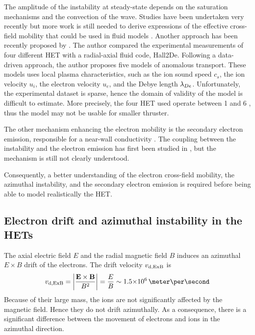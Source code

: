   The amplitude of the instability at steady-state depends on the saturation mechanisms and the convection of the wave.
  Studies have been  undertaken very recently but more work is still needed to derive expressions of the effective cross-field mobility that could be used in fluid models \citep{boeuf2017}.
  Another approach has been recently proposed by \citet{jorns2018}.
  The author compared the experimental measurements of four different \ac{HET} with a radial-axial fluid code, Hall2De.
  Following a data-driven approach, the author proposes five models of anomalous transport.
  These models uses local plasma characteristics, such as the ion sound speed $c_s$, the ion velocity $u_i$, the electron velocity $u_e$, and the Debye length $\lambda_{De}$.
  Unfortunately, the experimental dataset is sparse, hence the domain of validity of the model is difficult to estimate.
  More precisely, the four \ac{HET} used operate between 1 and 6 \kilo\watt, thus the model may not be usable for smaller thruster.
  
  \vspace{1em}
  The other mechanism enhancing the electron mobility is the secondary electron emission, responsible for a near-wall conductivity \citep{morozov1972,morozov2001, barral2003a}.
  The coupling between the instability and the electron emission has first been studied in \citet{heron2013}, but the mechanism is still not clearly understood.
  
  Consequently, a better understanding of the electron cross-field mobility, the azimuthal instability, and the secondary electron emission is required before being able to model realistically the \ac{HET}.
  
  \subsection*{Electron drift and azimuthal instability in the HETs}

  The axial electric field $E$ and the radial magnetic field $B$ induces an azimuthal $E\times B$ drift of the electrons.
  The drift velocity $v_{\rm d, ExB}$ is 
  \begin{equation} \label{eq-exbdriftbis}
    v_{\rm d, ExB} = \bigg\lvert \frac{\vect{E} \times \vect{B}}{B^2} \bigg\rvert = \frac{E}{B} \sim \sn{1.5}{6} \,\meter\per\second
  \end{equation}
  Because of their large mass, the ions are not significantly affected by the magnetic field.
  Hence they do not drift azimuthally.
  As a consequence, there is a significant difference between the movement of electrons and ions in the azimuthal direction.

